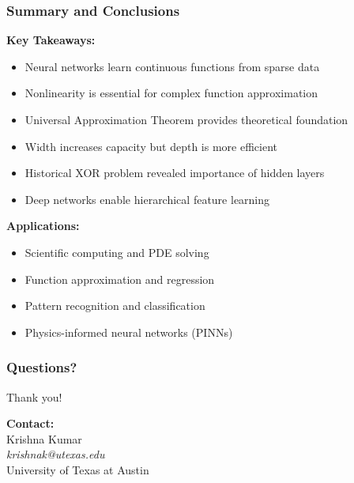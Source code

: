 \documentclass[notes]{beamer}
\begin{document}
\begin{frame}
\frametitle{Summary and Conclusions}

\textbf{Key Takeaways:}
\begin{itemize}
\item Neural networks learn continuous functions from sparse data
\item Nonlinearity is essential for complex function approximation
\item Universal Approximation Theorem provides theoretical foundation
\item Width increases capacity but depth is more efficient
\item Historical XOR problem revealed importance of hidden layers
\item Deep networks enable hierarchical feature learning
\end{itemize}

\textbf{Applications:}
\begin{itemize}
\item Scientific computing and PDE solving
\item Function approximation and regression
\item Pattern recognition and classification
\item Physics-informed neural networks (PINNs)
\end{itemize}

\end{frame}

\begin{frame}
\frametitle{Questions?}

\centering
\Large Thank you!

\vspace{2cm}

\textbf{Contact:} \\
Krishna Kumar \\
\textit{krishnak@utexas.edu} \\
University of Texas at Austin

\end{frame}
\end{document}
